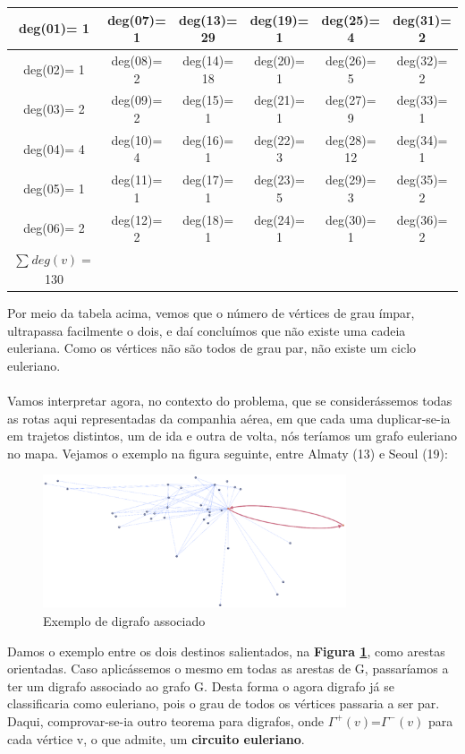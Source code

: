 \begin{center}
    \begin{tabular}{ |c|c|c|c|c|c| } 
     \hline
     deg(01)= 1 & deg(07)= 1 & deg(13)= 29 & deg(19)= 1 & deg(25)= 4 & deg(31)= 2\\
     \hline
     deg(02)= 1 & deg(08)= 2 & deg(14)= 18 & deg(20)= 1 & deg(26)= 5 & deg(32)= 2\\
     \hline
     deg(03)= 2 & deg(09)= 2 & deg(15)= 1 & deg(21)= 1 & deg(27)= 9 & deg(33)= 1\\
     \hline
     deg(04)= 4 & deg(10)= 4 & deg(16)= 1 & deg(22)= 3 & deg(28)= 12 & deg(34)= 1\\
     \hline
     deg(05)= 1 & deg(11)= 1 & deg(17)= 1 & deg(23)= 5 & deg(29)= 3 & deg(35)= 2\\
     \hline
     deg(06)= 2 & deg(12)= 2 & deg(18)= 1 & deg(24)= 1 & deg(30)= 1 & deg(36)= 2\\ 
     \hline
     $\sum_{}^{}deg(v)=$130 &   &   &   &   & \\
     \hline
    \end{tabular}
\end{center}

\indent Por meio da tabela acima, vemos que o número de vértices de grau ímpar, ultrapassa facilmente o dois, e 
daí concluímos que não existe uma cadeia euleriana. Como os vértices não são todos de grau par, não existe 
um ciclo euleriano.\\
\\
\indent Vamos interpretar agora, no contexto do problema, que se considerássemos todas as rotas aqui 
representadas da companhia aérea, em que cada uma duplicar-se-ia em trajetos distintos, um de ida e outra
de volta, nós teríamos um grafo euleriano no mapa.
Vejamos o exemplo na figura seguinte, entre Almaty (13) e Seoul (19):\\
\begin{figure}[h]
    \centering
    \includegraphics[width=0.8\textwidth]{imgs/Figura12}
    \caption{Exemplo de digrafo associado\label{fig:imagem12}}
\end{figure}
\clearpage
\indent Damos o exemplo entre os dois destinos salientados, na \textbf{Figura \ref{fig:imagem12}}, como arestas orientadas. Caso
aplicássemos o mesmo em todas as arestas de G, passaríamos a ter um digrafo associado ao grafo G. Desta 
forma o agora digrafo já se classificaria como euleriano, pois o grau de todos os vértices passaria a ser par.
Daqui, comprovar-se-ia outro teorema para digrafos, onde $\Gamma^+(v)$=$\Gamma^-(v)$
para cada vértice v, o que admite, um \textbf{circuito euleriano}.\\
   
